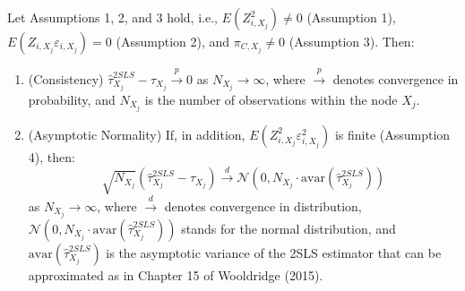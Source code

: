 \begin{thm}
   Let Assumptions 1, 2, and 3 hold, i.e., \(E(Z^2_{i,X_j}) \neq 0\) (Assumption 1), \(E(Z_{i,X_j} \varepsilon_{i,X_j}) = 0\) (Assumption 2), and \(\pi_{C,X_j} \neq 0\) (Assumption 3). Then:
   \begin{enumerate}
       \item (Consistency) \( \hat{\tau}^{2SLS}_{X_j} - \tau_{X_j} \overset{p}{\to} 0 \) as \( N_{X_j} \to \infty \), where \( \overset{p}{\to} \) denotes convergence in probability, and \( N_{X_j} \) is the number of observations within the node \( X_j \).
       \item (Asymptotic Normality) If, in addition, \(E(Z^2_{i,X_j} \varepsilon^2_{i,X_j})\) is finite (Assumption 4), then:
       \[
       \sqrt{N_{X_j}} (\hat{\tau}^{2SLS}_{X_j} - \tau_{X_j}) \overset{d}{\to} \mathcal{N}(0, N_{X_j} \cdot \text{avar}(\hat{\tau}^{2SLS}_{X_j}))
       \]
       as \(N_{X_j} \to \infty\), where \( \overset{d}{\to} \) denotes convergence in distribution, \( \mathcal{N}(0, N_{X_j} \cdot \text{avar}(\hat{\tau}^{2SLS}_{X_j})) \) stands for the normal distribution, and \(\text{avar}(\hat{\tau}^{2SLS}_{X_j})\) is the asymptotic variance of the 2SLS estimator that can be approximated as in Chapter 15 of Wooldridge (2015).
   \end{enumerate}
\end{thm}